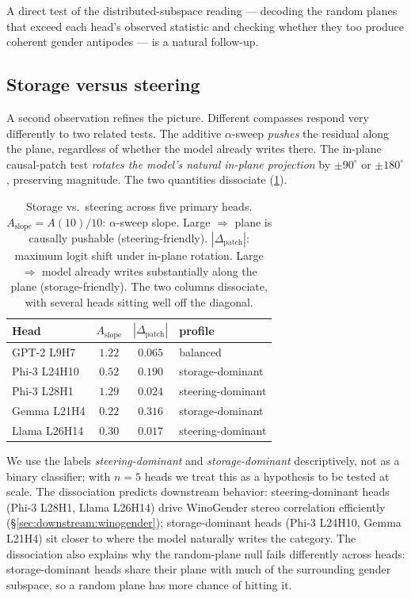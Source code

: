 A direct test of the distributed-subspace reading --- decoding the
random planes that exceed each head's observed statistic and
checking whether they too produce coherent gender antipodes ---
is a natural follow-up.

\subsection{Storage versus steering}
\label{sec:results:storage}

A second observation refines the picture. Different compasses respond
very differently to two related tests. The additive
$\alpha$-sweep \emph{pushes} the residual along the plane, regardless
of whether the model already writes there. The in-plane causal-patch
test \emph{rotates the model's natural in-plane projection} by
$\pm 90^\circ$ or $\pm 180^\circ$, preserving magnitude. The two
quantities dissociate (\cref{tab:storage}).

\begin{table}[t]
\centering
\small
\caption{Storage vs.\ steering across five primary heads.
$A_{\text{slope}} = A(10)/10$: $\alpha$-sweep slope. Large $\Rightarrow$
plane is causally pushable (steering-friendly).
$|\Delta_{\text{patch}}|$: maximum logit shift under in-plane rotation.
Large $\Rightarrow$ model already writes substantially along the plane
(storage-friendly). The two columns dissociate, with several heads
sitting well off the diagonal.}
\label{tab:storage}
\begin{tabular}{lccl}
\toprule
Head & $A_{\text{slope}}$ & $|\Delta_{\text{patch}}|$ & profile \\
\midrule
GPT-2 L9H7    & $1.22$ & $0.065$ & balanced \\
Phi-3 L24H10  & $0.52$ & $0.190$ & storage-dominant \\
Phi-3 L28H1   & $1.29$ & $0.024$ & steering-dominant \\
Gemma L21H4   & $0.22$ & $0.316$ & storage-dominant \\
Llama L26H14  & $0.30$ & $0.017$ & steering-dominant \\
\bottomrule
\end{tabular}
\end{table}

We use the labels \emph{steering-dominant} and \emph{storage-dominant}
descriptively, not as a binary classifier; with $n = 5$ heads we
treat this as a hypothesis to be tested at scale. The dissociation
predicts downstream behavior: steering-dominant heads (Phi-3 L28H1,
Llama L26H14) drive WinoGender stereo correlation efficiently
(\S\ref{sec:downstream:winogender}); storage-dominant heads
(Phi-3 L24H10, Gemma L21H4) sit closer to where the model naturally
writes the category. The dissociation also explains why the
random-plane null fails differently across heads: storage-dominant
heads share their plane with much of the surrounding gender
subspace, so a random plane has more chance of hitting it.

